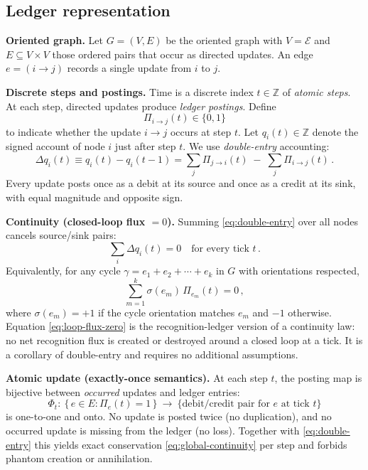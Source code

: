 \documentclass[11pt]{article}
\theoremstyle{definition}
\theoremstyle{remark}
\begin{document}
\subsection{Ledger representation}

\textbf{Oriented graph.}
Let \(G=(V,E)\) be the oriented graph with \(V=\mathcal{E}\) and \(E\subseteq V\times V\) those ordered pairs that occur as directed updates. An edge \(e=(i\to j)\) records a single update from \(i\) to \(j\).

\medskip
\textbf{Discrete steps and postings.}
Time is a discrete index \(t\in\mathbb{Z}\) of \emph{atomic steps}. At each step, directed updates produce \emph{ledger postings}. Define
\[
\Pi_{i\to j}(t)\in\{0,1\}
\]
to indicate whether the update \(i\to j\) occurs at step \(t\). Let \(q_i(t)\in\mathbb{Z}\) denote the signed account of node \(i\) just after step \(t\). We use \emph{double-entry} accounting:
\begin{equation}
\label{eq:double-entry}
\Delta q_i(t) \equiv q_i(t)-q_i(t-1)
= \sum_{j}\Pi_{j\to i}(t)\;-\;\sum_{j}\Pi_{i\to j}(t)\,.
\end{equation}
Every update posts once as a debit at its source and once as a credit at its sink, with equal magnitude and opposite sign.

\medskip
\textbf{Continuity (closed-loop flux \(=0\)).}
Summing \eqref{eq:double-entry} over all nodes cancels source/sink pairs:
\begin{equation}
\label{eq:global-continuity}
\sum_{i}\Delta q_i(t)=0 \quad \text{for every tick } t\,.
\end{equation}
Equivalently, for any cycle \(\gamma=e_1+e_2+\cdots+e_k\) in \(G\) with orientations respected,
\begin{equation}
\label{eq:loop-flux-zero}
\sum_{m=1}^{k}\sigma(e_m)\,\Pi_{e_m}(t)=0\,,
\end{equation}
where \(\sigma(e_m)=+1\) if the cycle orientation matches \(e_m\) and \(-1\) otherwise. Equation \eqref{eq:loop-flux-zero} is the recognition-ledger version of a continuity law: no net recognition flux is created or destroyed around a closed loop at a tick. It is a corollary of double-entry and requires no additional assumptions.

\medskip
\textbf{Atomic update (exactly-once semantics).}
At each step \(t\), the posting map is bijective between \emph{occurred} updates and ledger entries:
\begin{equation}
\label{eq:atomic-tick}
\Phi_t:\ \{\,e\in E:\Pi_e(t)=1\,\}\ \longrightarrow\ \{\text{debit/credit pair for }e\text{ at tick }t\}
\end{equation}
is one-to-one and onto. No update is posted twice (no duplication), and no occurred update is missing from the ledger (no loss). Together with \eqref{eq:double-entry} this yields exact conservation \eqref{eq:global-continuity} per step and forbids phantom creation or annihilation.
\end{document}
